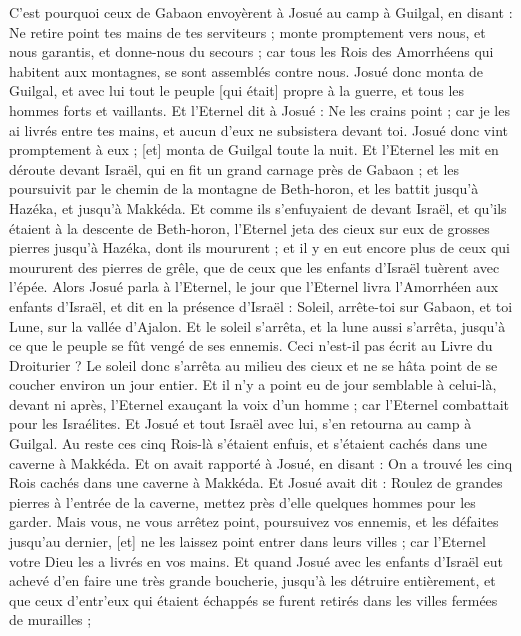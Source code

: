 \begin{multicols}{2}
C'est pourquoi ceux de Gabaon envoyèrent à Josué au camp à Guilgal, en disant : Ne retire point tes mains de tes serviteurs ; monte promptement vers nous, et nous garantis, et donne-nous du secours ; car tous les Rois des Amorrhéens qui habitent aux montagnes, se sont assemblés contre nous.
Josué donc monta de Guilgal, et avec lui tout le peuple [qui était] propre à la guerre, et tous les hommes forts et vaillants.
Et l'Eternel dit à Josué : Ne les crains point ; car je les ai livrés entre tes mains, et aucun d'eux ne subsistera devant toi.
Josué donc vint promptement à eux ; [et] monta de Guilgal toute la nuit.
Et l'Eternel les mit en déroute devant Israël, qui en fit un grand carnage près de Gabaon ; et les poursuivit par le chemin de la montagne de Beth-horon, et les battit jusqu'à Hazéka, et jusqu'à Makkéda.
Et comme ils s'enfuyaient de devant Israël, et qu'ils étaient à la descente de Beth-horon, l'Eternel jeta des cieux sur eux de grosses pierres jusqu'à Hazéka, dont ils moururent ; et il y en eut encore plus de ceux qui moururent des pierres de grêle, que de ceux que les enfants d'Israël tuèrent avec l'épée.
Alors Josué parla à l'Eternel, le jour que l'Eternel livra l'Amorrhéen aux enfants d'Israël, et dit en la présence d'Israël : Soleil, arrête-toi sur Gabaon, et toi Lune, sur la vallée d'Ajalon.
Et le soleil s'arrêta, et la lune aussi s'arrêta, jusqu'à ce que le peuple se fût vengé de ses ennemis. Ceci n'est-il pas écrit au Livre du Droiturier ? Le soleil donc s'arrêta au milieu des cieux et ne se hâta point de se coucher environ un jour entier.
Et il n'y a point eu de jour semblable à celui-là, devant ni après, l'Eternel exauçant la voix d'un homme ; car l'Eternel combattait pour les Israélites.
Et Josué et tout Israël avec lui, s'en retourna au camp à Guilgal.
Au reste ces cinq Rois-là s'étaient enfuis, et s'étaient cachés dans une caverne à Makkéda.
Et on avait rapporté à Josué, en disant : On a trouvé les cinq Rois cachés dans une caverne à Makkéda.
Et Josué avait dit : Roulez de grandes pierres à l'entrée de la caverne, mettez près d'elle quelques hommes pour les garder.
Mais vous, ne vous arrêtez point, poursuivez vos ennemis, et les défaites jusqu'au dernier, [et] ne les laissez point entrer dans leurs villes ; car l'Eternel votre Dieu les a livrés en vos mains.
Et quand Josué avec les enfants d'Israël eut achevé d'en faire une très grande boucherie, jusqu'à les détruire entièrement, et que ceux d'entr'eux qui étaient échappés se furent retirés dans les villes fermées de murailles ;

\end{multicols}
